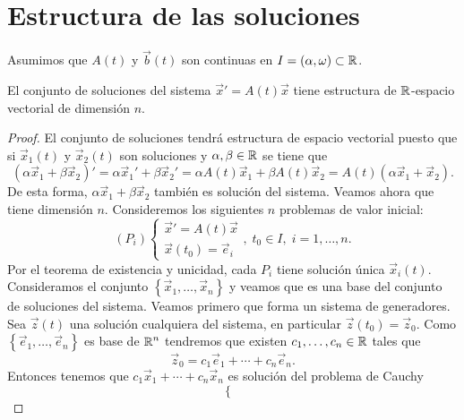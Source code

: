 \section{Estructura de las soluciones}
Asumimos que $\displaystyle A\left(t\right) $ y $\displaystyle \vec{b}\left(t\right) $ son continuas en $\displaystyle I = \left(\alpha, \omega \right) \subset \mathbb{R} $. 
\begin{theorem}
El conjunto de soluciones del sistema $\displaystyle \vec{x}'=A\left(t\right)\vec{x} $ tiene estructura  de $\displaystyle \mathbb{R} $-espacio vectorial de dimensión $\displaystyle n $. 
\end{theorem}
\begin{proof}
El conjunto de soluciones tendrá estructura de espacio vectorial puesto que si $\displaystyle \vec{x}_{1}\left(t\right) $ y $\displaystyle \vec{x}_{2}\left(t\right) $ son soluciones y $\displaystyle \alpha, \beta \in \mathbb{R} $ se tiene que 
\[\left(\alpha\vec{x}_{1} + \beta\vec{x}_{2}\right)' = \alpha\vec{x}_{1}' + \beta\vec{x}_{2}' = \alpha A\left(t\right)\vec{x}_{1}+\beta A\left(t\right)\vec{x}_{2}= A\left(t\right)\left(\alpha \vec{x}_{1} + \vec{x}_{2}\right) .\]
De esta forma, $\displaystyle \alpha\vec{x}_{1} + \beta\vec{x}_{2} $ también es solución del sistema. Veamos ahora que tiene dimensión $\displaystyle n $. Consideremos los siguientes $\displaystyle n $ problemas de valor inicial:
\[\left(P_{i}\right)
\begin{cases}
\vec{x}'=A\left(t\right)\vec{x} \\
\vec{x}\left(t_{0}\right)=\vec{e}_{i}
\end{cases}
, \; t_{0} \in I, \; i = 1, \ldots, n.\]
Por el teorema de existencia y unicidad, cada $\displaystyle P_{i} $ tiene solución única $\displaystyle \vec{x}_{i}\left(t\right) $. Consideramos el conjunto $\displaystyle \left\{ \vec{x}_{1}, \ldots, \vec{x}_{n}\right\}  $ y veamos que es una base del conjunto de soluciones del sistema. Veamos primero que forma un sistema de generadores. Sea $\displaystyle \vec{z}\left(t\right) $ una solución cualquiera del sistema, en particular $\displaystyle \vec{z}\left(t_{0}\right)=\vec{z}_{0} $. Como $\displaystyle \left\{ \vec{e}_{1}, \ldots, \vec{e}_{n}\right\}  $ es base de $\displaystyle \mathbb{R}^{n} $ tendremos que existen $\displaystyle c_{1}, \ldots, c_{n} \in \mathbb{R} $ tales que
\[\vec{z}_{0} =  c_{1}\vec{e}_{1} + \cdots + c_{n}\vec{e}_{n}.\]
Entonces tenemos que $\displaystyle c_{1}\vec{x}_{1} + \cdots + c_{n}\vec{x}_{n} $ es solución del problema de Cauchy
\[
\begin{cases}

\end{cases}\]
\end{proof}
